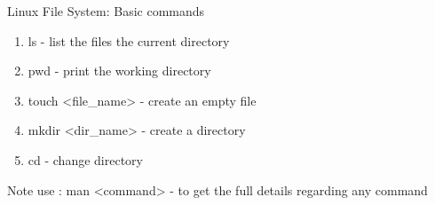 \documentclass{beamer}
\begin{document}
{\selectfont
\begin{frame}{Linux File System:  Basic commands}
\begin{enumerate}
	\item<2->ls  - list the files the current directory
	\item<3->pwd - print the working directory
	\item<4->touch <file\_name> - create an empty file 
	\item<5->mkdir <dir\_name> - create a directory
	\item<6->cd 	- change directory 
\end{enumerate}
	\begin{alertblock}{Note}
		{use : man <command> - to get the full details regarding any command }
	\end{alertblock}
\end{frame}
}
\end{document}
